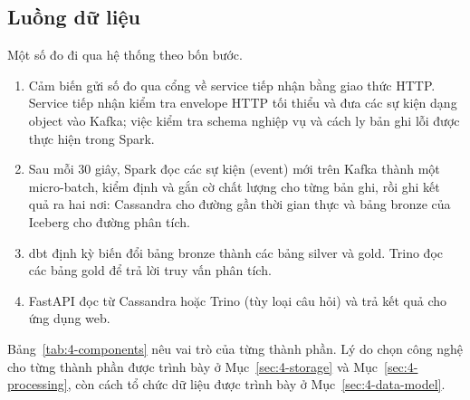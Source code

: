 \subsection{Luồng dữ liệu}
\label{sec:4-dataflow}

Một số đo đi qua hệ thống theo bốn bước.

\begin{enumerate}
  \item Cảm biến gửi số đo qua cổng về service tiếp nhận bằng giao thức HTTP. Service tiếp nhận kiểm tra envelope HTTP tối thiểu và đưa các sự kiện dạng object vào Kafka; việc kiểm tra schema nghiệp vụ và cách ly bản ghi lỗi được thực hiện trong Spark.
  \item Sau mỗi 30 giây, Spark đọc các sự kiện (event) mới trên Kafka thành một micro-batch, kiểm định và gắn cờ chất lượng cho từng bản ghi, rồi ghi kết quả ra hai nơi: Cassandra cho đường gần thời gian thực và bảng bronze của Iceberg cho đường phân tích.
  \item dbt định kỳ biến đổi bảng bronze thành các bảng silver và gold. Trino đọc các bảng gold để trả lời truy vấn phân tích.
  \item FastAPI đọc từ Cassandra hoặc Trino (tùy loại câu hỏi) và trả kết quả cho ứng dụng web.
\end{enumerate}

Bảng~\ref{tab:4-components} nêu vai trò của từng thành phần. Lý do chọn công nghệ cho từng thành phần được trình bày ở Mục~\ref{sec:4-storage} và Mục~\ref{sec:4-processing}, còn cách tổ chức dữ liệu được trình bày ở Mục~\ref{sec:4-data-model}.


